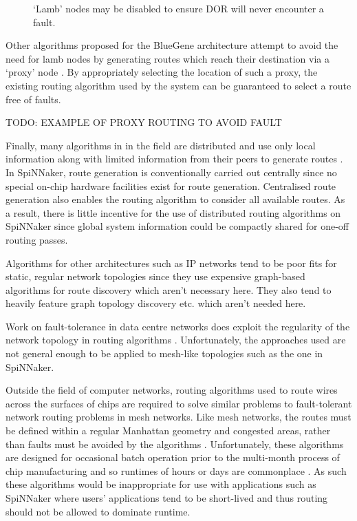 			\begin{figure}
				\center
				
				\caption{`Lamb' nodes may be disabled to ensure DOR will never
				encounter a fault.}
				\label{fig:lamb-nodes}
			\end{figure}
			
			Other algorithms proposed for the BlueGene architecture attempt to avoid
			the need for lamb nodes by generating routes which reach their destination
			via a `proxy' node \cite{gomez04}. By appropriately selecting the location
			of such a proxy, the existing routing algorithm used by the system can be
			guaranteed to select a route free of faults.
			
			TODO: EXAMPLE OF PROXY ROUTING TO AVOID FAULT
			
			Finally, many algorithms in in the field are distributed and use only local
			information along with limited information from their peers to generate
			routes \cite{fick09b}. In SpiNNaker, route generation is conventionally
			carried out centrally since no special on-chip hardware facilities exist
			for route generation. Centralised route generation also enables the routing
			algorithm to consider all available routes. As a result, there is little
			incentive for the use of distributed routing algorithms on SpiNNaker since
			global system information could be compactly shared for one-off routing
			passes.
			
			Algorithms for other architectures such as IP networks tend to be poor fits
			for static, regular network topologies since they use expensive graph-based
			algorithms for route discovery which aren't necessary here. They also tend
			to heavily feature graph topology discovery etc. which aren't needed here.
			
			Work on fault-tolerance in data centre networks does exploit the regularity
			of the network topology in routing algorithms \cite{guo08,liao12}.
			Unfortunately, the approaches used are not general enough to be applied to
			mesh-like topologies such as the one in SpiNNaker.
			
			Outside the field of computer networks, routing algorithms used to route
			wires across the surfaces of chips are required to solve similar problems
			to fault-tolerant network routing problems in mesh networks. Like mesh
			networks, the routes must be defined within a regular Manhattan geometry
			and congested areas, rather than faults must be avoided by the algorithms
			\cite{kahng11}.  Unfortunately, these algorithms are designed for
			occasional batch operation prior to the multi-month process of chip
			manufacturing and so runtimes of hours or days are commonplace
			\cite{nam08}. As such these algorithms would be inappropriate for use with
			applications such as SpiNNaker where users' applications tend to be
			short-lived and thus routing should not be allowed to dominate runtime.
	

